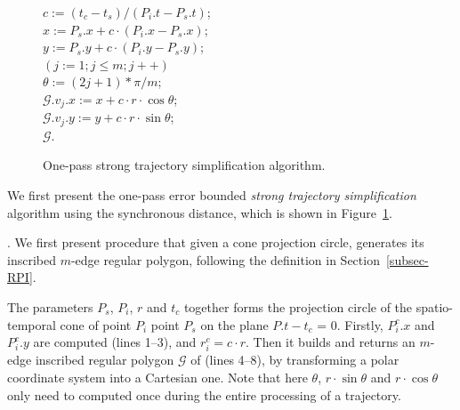 \begin{figure}[tb!]
\begin{center}
{\begin{minipage}{3.36in}
{%
	\bcc \hspace{1ex} $c := (t_c-t_s)/(P_i.t - P_s.t)$; \\
	\icc \hspace{1ex} $x := P_s.x + c\cdot(P_i.x-P_s.x)$; \\
	\icc \hspace{1ex} $y := P_s.y + c\cdot(P_i.y-P_s.y)$; \\
	\icc \hspace{1ex} \For $(j := 1;j \le m;j++)$ \Do \\
	\icc \> \hspace{2ex} $\theta :=  (2j + 1)*\pi /m $; \\
	\icc \> \hspace{2ex} $\mathcal{G}.v_j.x := x + c\cdot r\cdot\cos\theta$;\\
	\icc \> \hspace{2ex} $\mathcal{G}.v_j.y := y + c\cdot r\cdot\sin\theta$;\\
	\icc \hspace{1ex} \Return $\mathcal{G}$.
}
\vspace{-2ex}
\myhrule
\end{minipage}
}
\end{center}
\vspace{-2ex}
\caption{\small One-pass strong trajectory  simplification algorithm.}
\label{alg:CI3d}
\vspace{-2ex}
\end{figure}


 We first present the  one-pass error bounded {\em strong trajectory simplification} algorithm using the synchronous distance, which is shown in Figure~\ref{alg:CI3d}.

.
We first present procedure  that given a cone projection circle, generates its inscribed $m$-edge regular polygon,  following the definition in Section~\ref{subsec-RPI}.

The parameters $P_s$, $P_i$, $r$ and $t_c$ together forms the projection circle  of the spatio-temporal cone  of point $P_{i}$ \wrt point $P_s$ on the plane $P.t - t_c$ = $0$. Firstly, $P^c_i.x$ and $P^c_i.y$ are computed (lines 1--3), and $r^c_i = c\cdot r$.
Then it builds and returns an $m$-edge inscribed regular polygon $\mathcal{G}$ of  (lines 4--8), by transforming a polar coordinate system
into a Cartesian one. Note that here $\theta$, $r\cdot\sin\theta$ and $r\cdot\cos\theta$ only need to computed once during the entire processing of a trajectory.

